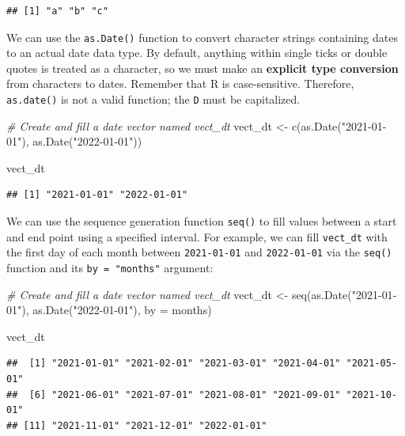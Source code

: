 \documentclass[
]{book}
\newenvironment{Shaded}{\begin{snugshade}}{\end{snugshade}}
\newcommand{\AttributeTok}[1]{\textcolor[rgb]{0.77,0.63,0.00}{#1}}
\newcommand{\CommentTok}[1]{\textcolor[rgb]{0.56,0.35,0.01}{\textit{#1}}}
\newcommand{\FunctionTok}[1]{\textcolor[rgb]{0.00,0.00,0.00}{#1}}
\newcommand{\NormalTok}[1]{#1}
\newcommand{\OtherTok}[1]{\textcolor[rgb]{0.56,0.35,0.01}{#1}}
\newcommand{\StringTok}[1]{\textcolor[rgb]{0.31,0.60,0.02}{#1}}
\begin{document}
\begin{verbatim}
## [1] "a" "b" "c"
\end{verbatim}

We can use the \texttt{as.Date()} function to convert character strings containing dates to an actual date data type. By default, anything within single ticks or double quotes is treated as a character, so we must make an \textbf{explicit type conversion} from characters to dates. Remember that R is case-sensitive. Therefore, \texttt{as.date()} is not a valid function; the \texttt{D} must be capitalized.

\begin{Shaded}
\begin{Highlighting}[]
\CommentTok{\# Create and fill a date vector named vect\_dt}
\NormalTok{vect\_dt }\OtherTok{\textless{}{-}} \FunctionTok{c}\NormalTok{(}\FunctionTok{as.Date}\NormalTok{(}\StringTok{"2021{-}01{-}01"}\NormalTok{), }\FunctionTok{as.Date}\NormalTok{(}\StringTok{"2022{-}01{-}01"}\NormalTok{))}

\NormalTok{vect\_dt}
\end{Highlighting}
\end{Shaded}

\begin{verbatim}
## [1] "2021-01-01" "2022-01-01"
\end{verbatim}

We can use the sequence generation function \texttt{seq()} to fill values between a start and end point using a specified interval. For example, we can fill \texttt{vect\_dt} with the first day of each month between \texttt{2021-01-01} and \texttt{2022-01-01} via the \texttt{seq()} function and its \texttt{by\ =\ "months"} argument:

\begin{Shaded}
\begin{Highlighting}[]
\CommentTok{\# Create and fill a date vector named vect\_dt}
\NormalTok{vect\_dt }\OtherTok{\textless{}{-}} \FunctionTok{seq}\NormalTok{(}\FunctionTok{as.Date}\NormalTok{(}\StringTok{"2021{-}01{-}01"}\NormalTok{), }\FunctionTok{as.Date}\NormalTok{(}\StringTok{"2022{-}01{-}01"}\NormalTok{), }\AttributeTok{by =} \StringTok{\textquotesingle{}months\textquotesingle{}}\NormalTok{)}

\NormalTok{vect\_dt}
\end{Highlighting}
\end{Shaded}

\begin{verbatim}
##  [1] "2021-01-01" "2021-02-01" "2021-03-01" "2021-04-01" "2021-05-01"
##  [6] "2021-06-01" "2021-07-01" "2021-08-01" "2021-09-01" "2021-10-01"
## [11] "2021-11-01" "2021-12-01" "2022-01-01"
\end{verbatim}
\end{document}
